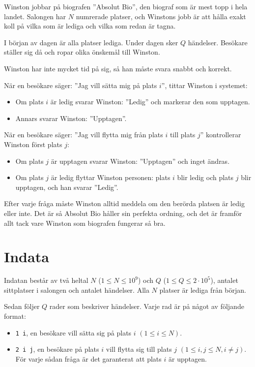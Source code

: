 

Winston jobbar på biografen ''Absolut Bio'', den biograf som är mest topp i hela landet.
Salongen har $N$ numrerade platser, och Winstons jobb är att hålla exakt koll på
vilka som är lediga och vilka som redan är tagna.

I början av dagen är alla platser lediga.
Under dagen sker $Q$ händelser. Besökare ställer sig då och ropar olika önskemål till Winston.

Winston har inte mycket tid på sig, så han måste svara snabbt och korrekt.


När en besökare säger: ''Jag vill sätta mig på plats $i$'', tittar Winston i systemet:
\begin{itemize}
  \item Om plats $i$ är ledig svarar Winston: ''Ledig'' och markerar den som upptagen.
  \item Annars svarar Winston: ''Upptagen''.
\end{itemize}

När en besökare säger: ''Jag vill flytta mig från plats $i$ till plats $j$'' kontrollerar Winston först plats $j$:
\begin{itemize}
  \item Om plats $j$ är upptagen svarar Winston: ''Upptagen'' och inget ändras.
  \item Om plats $j$ är ledig flyttar Winston personen: plats $i$ blir ledig och plats $j$ blir upptagen, och han svarar ''Ledig''.
\end{itemize}

Efter varje fråga måste Winston alltid meddela om den berörda platsen är ledig eller inte. Det är så Absolut Bio håller sin perfekta ordning, och det är framför allt tack vare Winston som biografen fungerar så bra.

\section*{Indata}
Indatan består av två heltal $N$ ($1 \le N \le 10^{9}$) och $Q$ ($1 \le Q \le 2 \cdot 10^{5}$), antalet sittplatser i salongen och antalet händelser. 
Alla $N$ platser är lediga från början.

Sedan följer $Q$ rader som beskriver händelser. Varje rad är på något av följande format:
\begin{itemize}
  \item \texttt{1 i}, en besökare vill sätta sig på plats $i$ $(1 \le i \le N)$.
  \item \texttt{2 i j}, en besökare på plats $i$ vill flytta sig till plats $j$ $(1 \le i, j \le N, i \neq j)$. För varje sådan fråga är det garanterat att plats $i$ är upptagen.
\end{itemize}


